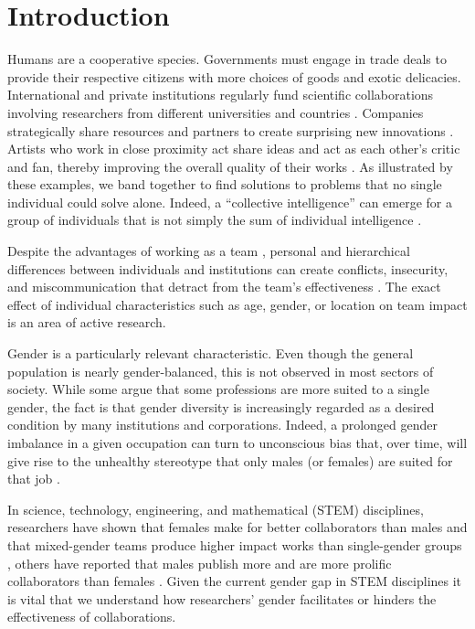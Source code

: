 \chapter{Introduction}
\label{ch:intro}

Humans are a cooperative species. Governments must engage in trade deals to provide their respective citizens with more choices of goods and exotic delicacies. International and private institutions regularly fund scientific collaborations involving researchers from different universities and countries \cite{Bordons1996}. Companies strategically share resources and partners to create surprising new innovations \cite{Ahuja2000,Dyer2002}. Artists who work in close proximity act share ideas and act as each other's critic and fan, thereby improving the overall quality of their works \cite{Uzzi2005}. As illustrated by these examples, we band together to find solutions to problems that no single individual could solve alone. Indeed, a ``collective intelligence'' can emerge for a group of individuals that is not simply the sum of individual intelligence \cite{Woolley2010}.

Despite the advantages of working as a team \cite{Gajda2004,Guimera2005,Uzzi2005,Wuchty2007,Katzenback2008}, personal and hierarchical differences between individuals and institutions can create conflicts, insecurity, and miscommunication that detract from the team's effectiveness \cite{Edmonson1999,Jehn1999,Cummings2005,Jones2008}. The exact effect of individual characteristics such as age, gender, or location on team impact is an area of active research.

Gender is a particularly relevant characteristic. Even though the general population is nearly gender-balanced, this is not observed in most sectors of society. While some argue that some professions are more suited to a single gender, the fact is that gender diversity is increasingly regarded as a desired condition by many institutions and corporations. Indeed, a prolonged gender imbalance in a given occupation can turn to unconscious bias that, over time, will give rise to the unhealthy stereotype that only males (or females) are suited for that job \cite{Editorials2013}.

In science, technology, engineering, and mathematical (STEM) disciplines, researchers have shown that females make for better collaborators than males \cite{Berdahl2005,Kummerli2007,Bart2013} and that mixed-gender teams produce higher impact works than single-gender groups \cite{Campbell2013}, others have reported that males publish more \cite{Kyvik1996} and are more prolific collaborators than females \cite{Lee2005,Abramo2013}. Given the current gender gap in STEM disciplines it is vital that we understand how researchers' gender facilitates or hinders the effectiveness of collaborations.

